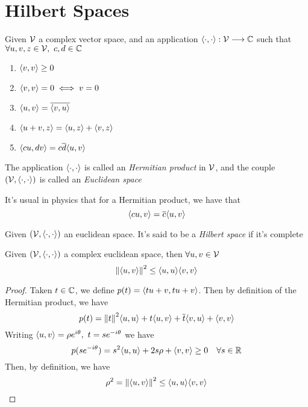 \documentclass[../complete.tex]{subfiles}
\begin{document}
\section{Hilbert Spaces}
\begin{dfn}
	Given $\mathcal{V}$ a complex vector space, and an application $\langle \cdot, \cdot \rangle:\mathcal{V}\overset{}{\longrightarrow}\mathbb{C}$ such that $\forall u,v,z\in\mathcal{V},\ c,d\in\mathbb{C}$
	\begin{enumerate}
	\item $\langle v, v \rangle\ge0$
	\item $\langle v, v \rangle=0\iff v=0$
	\item $\langle u, v \rangle=\overline{\langle v, u \rangle}$
	\item $\langle u+v, z \rangle=\langle u, z \rangle+\langle v, z \rangle$
	\item $\langle cu, dv \rangle=c\overline{d}\langle u, v \rangle$
	\end{enumerate}
	The application $\langle \cdot, \cdot \rangle$ is called an \textit{Hermitian product} in $\mathcal{V}$, and the couple $(\mathcal{V},\langle \cdot, \cdot \rangle)$ is called an \textit{Euclidean space}
\end{dfn}
\begin{rmk}
	It's usual in physics that for a Hermitian product, we have that
	\begin{equation}
		\langle cu, v \rangle=\overline{c}\langle u, v \rangle
		\label{eq:physicshermprod}
	\end{equation}
\end{rmk}
\begin{dfn}
	Given $(\mathcal{V},\langle \cdot, \cdot \rangle)$ an euclidean space. It's said to be a \textit{Hilbert space} if it's complete
\end{dfn}
\begin{thm}
	Given $(\mathcal{V},\langle \cdot, \cdot \rangle)$ a complex euclidean space, then $\forall u,v\in\mathcal{V}$
	\begin{equation}
		\norm{\langle u, v \rangle}^2\le\langle u, u \rangle\langle v, v \rangle
		\label{eq:cauchyschwartzineq}
	\end{equation}
\end{thm}
\begin{proof}
	Taken $t\in\mathbb{C}$, we define $p(t)=\langle tu+v, tu+v \rangle$. Then by definition of the Hermitian product, we have
	\begin{equation*}
		p(t)=\norm{t}^2\langle u, u \rangle+t\langle u, v \rangle+\overline{t}\langle v, u \rangle+\langle v, v \rangle
	\end{equation*}
	Writing $\spr{u}{v}=\rho e^{i\theta},\ t=se^{-i\theta}$ we have
	\begin{equation*}
		p(se^{-i\theta})=s^2\langle u, u \rangle+2s\rho+\langle v, v \rangle\ge0\quad\forall s\in\mathbb{R}
	\end{equation*}
	Then, by definition, we have
	\begin{equation*}
		\rho^2=\norm{\langle u, v \rangle}^2\le\langle u, u \rangle\langle v, v \rangle
	\end{equation*}
\end{proof}
\end{document}

